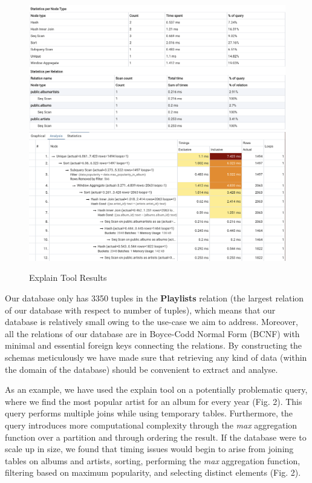 \documentclass[conference]{IEEEtran}
\begin{document}
\begin{figure}
    \includegraphics[scale=.41]{explain.png}
    \includegraphics[scale=.40]{explain2.png}
    \caption{Explain Tool Results}
    \label{Fig:Explain Tool Results - Query 4}
\end{figure}


Our database only has 3350 tuples in the \textbf{Playlists} relation (the largest relation of our database with respect to number of tuples), which means that our database is relatively small owing to the use-case we aim to address. Moreover, all the relations of our database are in Boyce-Codd Normal Form (BCNF) with minimal and essential foreign keys connecting the relations. By constructing the schemas meticulously we have made sure that retrieving any kind of data (within the domain of the database) should be convenient to extract and analyse. 

As an example, we have used the explain tool on a potentially problematic query, where we find the most popular artist for an album for every year (Fig. 2). This query performs multiple joins while using temporary tables. Furthermore, the query introduces more computational complexity through the \textit{max} aggregation function over a partition and through ordering the result. If the database were to scale up in size, we found that timing issues would begin to arise from joining tables on albums and artists, sorting, performing the \textit{max} aggregation function, filtering based on maximum popularity, and selecting distinct elements (Fig. 2).
\end{document}
